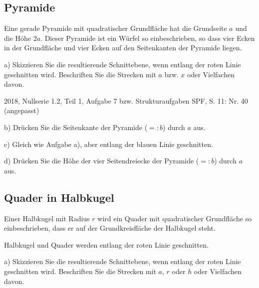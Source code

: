 \subsection{Pyramide}
Eine gerade Pyramide mit quadratischer Grundfläche hat die
Grundseite $a$ und die Höhe $2a$. Dieser Pyramide ist ein Würfel
so einbeschrieben, so dass vier Ecken in der Grundfläche und
vier Ecken auf den Seitenkanten der Pyramide liegen.

a) Skizzieren Sie die resultierende Schnittebene, wenn entlang der
roten Linie geschnitten wird. Beschriften Sie die Strecken mit $a$ bzw.
$x$ oder Vielfachen davon.

{\tiny{2018, Nullserie 1.2, Teil 1, Aufgabe 7 bzw. Strukturaufgaben SPF, S. 11: Nr. 40 (angepasst)}}



b) Drücken Sie die Seitenkante der Pyramide ($=:b$) durch $a$ aus.



c) Gleich wie Aufgabe a), aber entlang der blauen Linie geschnitten.



d) Drücken Sie die Höhe der vier Seitendreiecke der Pyramide ($=:b$) durch $a$ aus.

\subsection{Quader in Halbkugel}

Einer Halbkugel mit Radius $r$ wird ein Quader mit quadratischer
Grundfläche so einbeschrieben, dass er auf der Grundkreisfläche
der Halbkugel steht.

Halbkugel und Quader werden entlang der roten Linie geschnitten.


a) Skizzieren Sie die resultierende Schnittebene, wenn entlang der
roten Linie geschnitten wird. Beschriften Sie die Strecken mit $a$,
$r$ oder $h$ oder Vielfachen davon.


